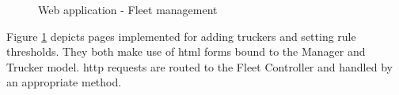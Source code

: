 \begin{figure}[H]
\centering
\caption{Web application - Fleet management}
\label{fig:webapp_fleet_management}
\end{figure}
Figure \ref{fig:webapp_fleet_management} depicts pages implemented for adding truckers and setting rule thresholds.
They both make use of \ac{html} forms bound to the Manager and Trucker model.
\Ac{http} requests are routed to the Fleet Controller and handled by an appropriate method.

